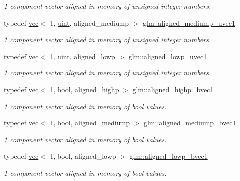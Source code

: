 \begin{DoxyCompactItemize}
\begin{DoxyCompactList}\small\item\em 1 component vector aligned in memory of unsigned integer numbers. \end{DoxyCompactList}\item 
typedef \hyperlink{structglm_1_1vec}{vec}$<$ 1, \hyperlink{group__core__precision_ga4fd29415871152bfb5abd588334147c8}{uint}, aligned\+\_\+mediump $>$ \hyperlink{group__gtc__type__aligned_ga7988ca1255907c807b71cb09a7cb590a}{glm\+::aligned\+\_\+mediump\+\_\+uvec1}
\begin{DoxyCompactList}\small\item\em 1 component vector aligned in memory of unsigned integer numbers. \end{DoxyCompactList}\item 
typedef \hyperlink{structglm_1_1vec}{vec}$<$ 1, \hyperlink{group__core__precision_ga4fd29415871152bfb5abd588334147c8}{uint}, aligned\+\_\+lowp $>$ \hyperlink{group__gtc__type__aligned_ga00df1f632a2e6c173796b5cede1be57c}{glm\+::aligned\+\_\+lowp\+\_\+uvec1}
\begin{DoxyCompactList}\small\item\em 1 component vector aligned in memory of unsigned integer numbers. \end{DoxyCompactList}\item 
typedef \hyperlink{structglm_1_1vec}{vec}$<$ 1, bool, aligned\+\_\+highp $>$ \hyperlink{group__gtc__type__aligned_ga92b3b4333bdc881b8ae27414162df481}{glm\+::aligned\+\_\+highp\+\_\+bvec1}
\begin{DoxyCompactList}\small\item\em 1 component vector aligned in memory of bool values. \end{DoxyCompactList}\item 
typedef \hyperlink{structglm_1_1vec}{vec}$<$ 1, bool, aligned\+\_\+mediump $>$ \hyperlink{group__gtc__type__aligned_gad5720386d2fb75c295f49312284abd13}{glm\+::aligned\+\_\+mediump\+\_\+bvec1}
\begin{DoxyCompactList}\small\item\em 1 component vector aligned in memory of bool values. \end{DoxyCompactList}\item 
typedef \hyperlink{structglm_1_1vec}{vec}$<$ 1, bool, aligned\+\_\+lowp $>$ \hyperlink{group__gtc__type__aligned_ga188725767d0c2d0331f89574c543e600}{glm\+::aligned\+\_\+lowp\+\_\+bvec1}
\begin{DoxyCompactList}\small\item\em 1 component vector aligned in memory of bool values. \end{DoxyCompactList}\item 

\end{DoxyCompactItemize}
